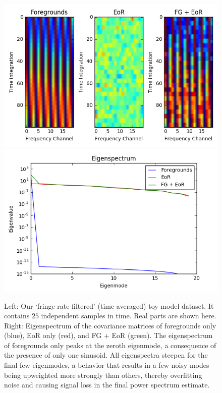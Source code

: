 \documentclass[preprint2,numberedappendix,tighten,twocolappendix]{aastex6}  %
\begin{document}
\begin{figure}
	\centering
	\includegraphics[trim={0.3cm 0.2cm 0.3cm 0.3cm},clip,height=0.3\textwidth]{plots/toy_sigloss5.png}
	\includegraphics[trim={0.3cm 0.2cm 0.3cm 0.3cm},clip,height=0.3\textwidth]{plots/toy_sigloss6.png}
	\caption{Left: Our `fringe-rate filtered' (time-averaged) toy model dataset. It contains $25$ independent samples in time. Real parts are shown here. Right: Eigenspectrum of the covariance matrices of foregrounds only (blue), EoR only (red), and FG + EoR (green). The eigenspectrum of foregrounds only peaks at the zeroth eigenmode, a consequence of the presence of only one sinusoid. All eigenspectra steepen for the final few eigenmodes, a behavior that results in a few noisy modes being upweighted more strongly than others, thereby overfitting noise and causing signal loss in the final power spectrum estimate.}
	\label{fig:toy_sigloss5}
\end{figure}
\end{document}
